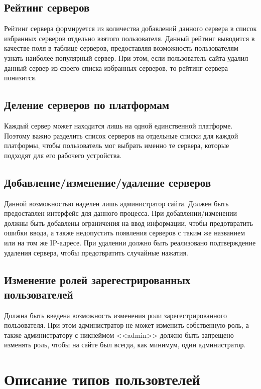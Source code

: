 \subsection{Рейтинг серверов}

Рейтинг сервера формируется из количества добавлений данного сервера в список избранных серверов отдельно взятого пользователя. Данный рейтинг выводится в качестве поля в таблице серверов, предоставляя возможность пользователям узнать наиболее популярный сервер. При этом, если пользователь сайта удалил данный сервер из своего списка избранных серверов, то рейтинг сервера понизится.


\subsection{Деление серверов по платформам}

Каждый сервер может находится лишь на одной единственной платформе. Поэтому важно разделить список серверов на отдельные списки для каждой платформы, чтобы пользователь мог выбрать именно те сервера, которые подходят для его рабочего устройства.


\subsection{Добавление/изменение/удаление серверов}

Данной возможностью наделен лишь администратор сайта. Должен быть предоставлен интерфейс для данного процесса. При добавлении/изменении должны быть добавлены ограничения на ввод информации, чтобы предотвратить ошибки ввода, а также недопустить появления серверов с таким же названием или на том же IP-адресе. При удалении должно быть реализовано подтверждение удаления сервера, чтобы предотвратить случайные нажатия.


\subsection{Изменение ролей зарегестрированных пользователей}

Должна быть введена возможность изменения роли зарегестрированного пользователя. При этом администратор не может изменить собственную роль, а также администратору с никнеймом <<admin>> должно быть запрещено изменять роль, чтобы на сайте был всегда, как минимум, один администратор.


\section{Описание типов пользовтелей}

